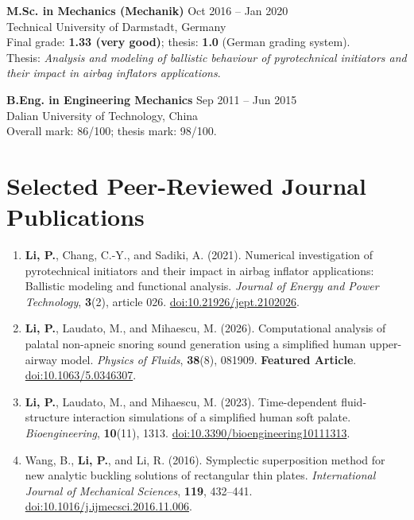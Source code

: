 \documentclass[a4paper,10pt]{article}
\begin{document}
\vspace{5pt}
\textbf{M.Sc. in Mechanics (Mechanik)} \hfill Oct 2016 -- Jan 2020\\
Technical University of Darmstadt, Germany\\
Final grade: \textbf{1.33 (very good)}; thesis: \textbf{1.0} (German grading system).\\
Thesis: \textit{Analysis and modeling of ballistic behaviour of pyrotechnical initiators
and their impact in airbag inflators applications}.

\vspace{5pt}
\textbf{B.Eng. in Engineering Mechanics} \hfill Sep 2011 -- Jun 2015\\
Dalian University of Technology, China\\
Overall mark: 86/100; thesis mark: 98/100.

\section{Selected Peer-Reviewed Journal Publications}
\begin{enumerate}
\item \textbf{Li, P.}, Chang, C.-Y., and Sadiki, A. (2021).
Numerical investigation of pyrotechnical initiators and their impact in airbag inflator
applications: Ballistic modeling and functional analysis.
\textit{Journal of Energy and Power Technology}, \textbf{3}(2), article 026.
\href{https://doi.org/10.21926/jept.2102026}{doi:10.21926/jept.2102026}.
\item \textbf{Li, P.}, Laudato, M., and Mihaescu, M. (2026).
Computational analysis of palatal non-apneic snoring sound generation using a simplified
human upper-airway model. \textit{Physics of Fluids}, \textbf{38}(8), 081909.
\textbf{Featured Article}.
\href{https://doi.org/10.1063/5.0346307}{doi:10.1063/5.0346307}.
\item \textbf{Li, P.}, Laudato, M., and Mihaescu, M. (2023).
Time-dependent fluid-structure interaction simulations of a simplified human soft palate.
\textit{Bioengineering}, \textbf{10}(11), 1313.
\href{https://doi.org/10.3390/bioengineering10111313}{doi:10.3390/bioengineering10111313}.
\item Wang, B., \textbf{Li, P.}, and Li, R. (2016).
Symplectic superposition method for new analytic buckling solutions of rectangular thin plates.
\textit{International Journal of Mechanical Sciences}, \textbf{119}, 432--441.
\href{https://doi.org/10.1016/j.ijmecsci.2016.11.006}{doi:10.1016/j.ijmecsci.2016.11.006}.
\end{enumerate}
\end{document}

